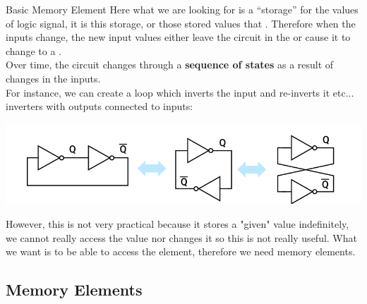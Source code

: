     \begin{parag}{Basic Memory Element}
            Here what we are looking for is a ``storage'' for the values of logic signal, it is this storage, or those stored values that . Therefore when the inputs change, the new input values either leave the circuit in the  or cause it to change to a .\\
            Over time, the circuit changes through a \textbf{sequence of states} as a result of changes in the inputs.\\
        For instance, we can create a loop which inverts the input and re-inverts it etc... \\
        inverters with outputs connected to inputs:
        \begin{center}
            \includegraphics[scale=0.5]{32025-03-31.png}
        \end{center}
        
       However, this is not very practical because it stores a "given" value indefinitely, we cannot really access the value nor changes it so this is not really useful. What we want is to be able to access the element, therefore we need memory elements.
    
    \end{parag}
    \subsection{Memory Elements}
